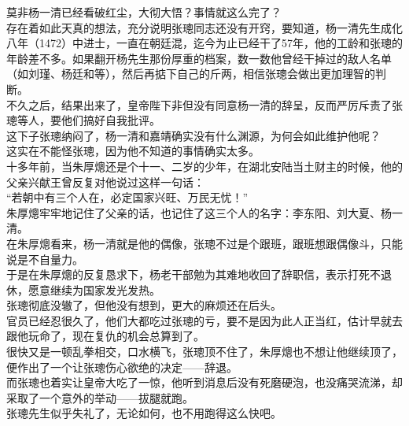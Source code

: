 \begin{multicols}{\theparacolNo}
莫非杨一清已经看破红尘，大彻大悟？事情就这么完了？\\

存在着如此天真的想法，充分说明张璁同志还没有开窍，要知道，杨一清先生成化八年（1472）中进士，一直在朝廷混，迄今为止已经干了57年，他的工龄和张璁的年龄差不多。如果翻开杨先生那份厚重的档案，数一数他曾经干掉过的敌人名单（如刘瑾、杨廷和等），然后再掂下自己的斤两，相信张璁会做出更加理智的判断。\\

不久之后，结果出来了，皇帝陛下非但没有同意杨一清的辞呈，反而严厉斥责了张璁等人，要他们搞好自我批评。\\

这下子张璁纳闷了，杨一清和嘉靖确实没有什么渊源，为何会如此维护他呢？\\

这实在不能怪张璁，因为他不知道的事情确实太多。\\

十多年前，当朱厚熜还是个十一、二岁的少年，在湖北安陆当土财主的时候，他的父亲兴献王曾反复对他说过这样一句话：\\

“若朝中有三个人在，必定国家兴旺、万民无忧！”\\

朱厚熜牢牢地记住了父亲的话，也记住了这三个人的名字：李东阳、刘大夏、杨一清。\\

在朱厚熜看来，杨一清就是他的偶像，张璁不过是个跟班，跟班想跟偶像斗，只能说是不自量力。\\

于是在朱厚熜的反复恳求下，杨老干部勉为其难地收回了辞职信，表示打死不退休，愿意继续为国家发光发热。\\

张璁彻底没辙了，但他没有想到，更大的麻烦还在后头。\\

官员已经忍很久了，他们大都吃过张璁的亏，要不是因为此人正当红，估计早就去跟他玩命了，现在复仇的机会总算到了。\\

很快又是一顿乱拳相交，口水横飞，张璁顶不住了，朱厚熜也不想让他继续顶了，便作出了一个让张璁伤心欲绝的决定——辞退。\\

而张璁也着实让皇帝大吃了一惊，他听到消息后没有死磨硬泡，也没痛哭流涕，却采取了一个意外的举动——拔腿就跑。\\

张璁先生似乎失礼了，无论如何，也不用跑得这么快吧。\\


\end{multicols}
